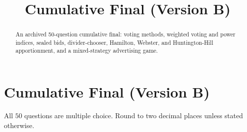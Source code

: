 \documentclass[12pt]{ximera}
\title{Cumulative Final (Version B)}
\begin{document}
\begin{abstract}
An archived 50-question cumulative final: voting methods, weighted voting and power indices, sealed bids, divider-chooser, Hamilton, Webster, and Huntington-Hill apportionment, and a mixed-strategy advertising game.
\end{abstract}
\maketitle

\section*{Cumulative Final (Version B)}

All $50$ questions are multiple choice. Round to two decimal places unless stated otherwise.
\end{document}
